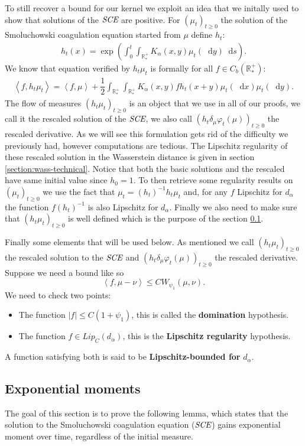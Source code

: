 \documentclass[11pt,a4paper]{article}
\newcommand{\RRP}{\mathbb{R}^+_*}
\newcommand{\SCE}{\emph{SCE}}
\newcommand{\Proc}[1]{\left(#1\right)_{t\geq 0}}
\newcommand{\brac}[1]{\left\langle#1\right\rangle}
\newcommand{\dd}{\mathop{}\!\mathrm{d}}
\begin{document}
To still recover a bound for our kernel we exploit an idea that we initally used to show that solutions of the $\SCE$ are positive. For $\Proc{\mu_t}$ the solution of the Smoluchowski coagulation equation  started from $\mu$ define $h_t$:
\begin{align*}
    h_t(x) = \exp\left(\int_0^t\int_{\RRP} K_\alpha(x,y) \mu_t(\dd y)\dd s\right).
\end{align*}
We know that equation verified by $h_t\mu_t$ is formally for all $f \in C_b(\RRP)$:
\begin{align*}
    \brac{f,h_t\mu_t} = \brac{f,\mu} + \dfrac{1}{2}\int_{\RRP} \int_{\RRP} K_\alpha(x,y) fh_t(x+y) \mu_t(\dd x) \mu_t (\dd y) .
\end{align*}
The flow of measures $\Proc{h_t\mu_t}$ is an object that we use in all of our proofs, we call it the rescaled solution of the $\SCE$, we also call $\Proc{h_t\delta_{\mu}\varphi_t(\mu)}$ the rescaled derivative. As we will see this formulation gets rid of the difficulty we previously had, however computations are tedious. The Lipschitz regularity of these rescaled solution in the Wasserstein distance is given in section \ref{section:wass-technical}. Notice that both the basic solutions and the rescaled have same initial value since $h_0 = 1$. To then retrieve some regularity results on $\Proc{\mu_t}$ we use the fact that $\mu_t = (h_t)^{-1}h_t \mu_t$ and, for any $f$ Lipschitz for $d_\alpha$ the function $f(h_t)^{-1}$ is also Lipschitz for $d_\alpha$. Finally we also need to make sure that $\Proc{h_t\mu_t}$ is well defined which is the purpose of the section \ref{section:wass-exponential}.

Finally some elements that will be used below. As mentioned we call $\Proc{h_t\mu_t}$ the rescaled solution to the $\SCE$ and $\Proc{h_t\delta_{\mu}\varphi_t(\mu)}$ the rescaled derivative. Suppose we need a bound like so
\[\brac{f,\mu-\nu} \leq C W_{\psi_1}(\mu,\nu).\]
We need to check two points:
\begin{itemize}
    \item The function $|f| \leq C(1 + \psi_1)$, this is called the \textbf{domination} hypothesis.
    \item The function $f \in Lip_C(d_\alpha)$, this is the \textbf{Lipschitz regularity} hypothesis.
\end{itemize}
A function satisfying both is said to be \textbf{Lipschitz-bounded for} $d_\alpha$.

\subsection{Exponential moments}\label{section:wass-exponential}
The goal of this section is to prove the following lemma, which states that the solution to the Smoluchowski coagulation equation ($\SCE$) gains exponential moment over time, regardless of the initial measure.
\end{document}

